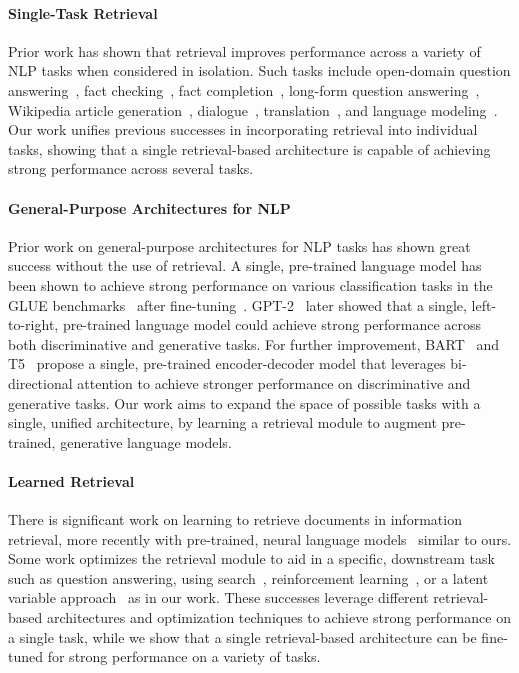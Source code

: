 
\paragraph{Single-Task Retrieval}
Prior work has shown that retrieval improves performance across a variety of NLP tasks when considered in isolation.
Such tasks include open-domain question answering~\cite{chen_reading_2017,kwiatkowski_natural_2019},  fact checking~\cite{thorne-etal-2018-fever}, fact completion~\cite{petroni2020how}, long-form question answering~\cite{fan-etal-2019-eli5}, Wikipedia article generation~\cite{liu2018generating}, dialogue~\cite{moghe-etal-2018-towards,weston-etal-2018-retrieve,dinan2018wizard,fan2020augmenting}, translation~\cite{gu2018search}, and language modeling~\cite{guu-etal-2018-generating,khandelwal2020generalization}.
Our work unifies previous successes in incorporating retrieval into individual tasks, showing that a single retrieval-based architecture is capable of achieving strong performance across several tasks.

\paragraph{General-Purpose Architectures for NLP}
Prior work on general-purpose architectures for NLP tasks has shown great success without the use of retrieval.
A single, pre-trained language model has been shown to achieve strong performance on various classification tasks in the GLUE benchmarks~\cite{wang-etal-2018-glue,wang_superglue_2019} after fine-tuning~\cite{radford_improving_2018,devlin_bert:_2019}.
GPT-2~\citep{radford2019language} later showed that a single, left-to-right, pre-trained language model could achieve strong performance across both discriminative and generative tasks.
For further improvement, BART~\cite{lewis2019bart} and T5~\cite{raffel2019t5,roberts2020t5cqba} propose a single, pre-trained encoder-decoder model that leverages bi-directional attention to achieve stronger performance on discriminative and generative tasks.
Our work aims to expand the space of possible tasks with a single, unified architecture, by learning a retrieval module to augment pre-trained, generative language models.

\paragraph{Learned Retrieval}
There is significant work on learning to retrieve documents in information retrieval, more recently with pre-trained, neural language models~\cite{nogueira2019passage,Karpukhin20dense} similar to ours.
Some work optimizes the retrieval module to aid in a specific, downstream task such as question answering, using search~\cite{perez-etal-2019-finding}, reinforcement learning~\cite{choi-etal-2017-coarse,wang2018evidence-aggregation,wang2018r3}, or a latent variable approach~\cite{lee-etal-2019-latent,guu2020realm} as in our work.
These successes leverage different retrieval-based architectures and optimization techniques to achieve strong performance on a single task, while we show that a single retrieval-based architecture can be fine-tuned for strong performance on a variety of tasks.

